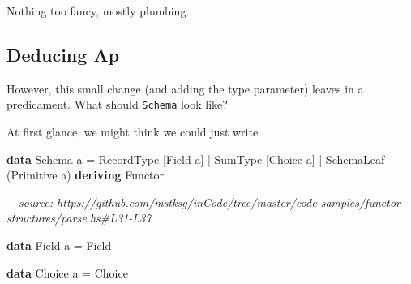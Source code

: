 \documentclass[]{article}
\newenvironment{Shaded}{}{}
\newcommand{\CommentTok}[1]{\textcolor[rgb]{0.38,0.63,0.69}{\textit{#1}}}
\newcommand{\DataTypeTok}[1]{\textcolor[rgb]{0.56,0.13,0.00}{#1}}
\newcommand{\FunctionTok}[1]{\textcolor[rgb]{0.02,0.16,0.49}{#1}}
\newcommand{\KeywordTok}[1]{\textcolor[rgb]{0.00,0.44,0.13}{\textbf{#1}}}
\newcommand{\NormalTok}[1]{#1}
\newcommand{\OperatorTok}[1]{\textcolor[rgb]{0.40,0.40,0.40}{#1}}
\newcommand{\OtherTok}[1]{\textcolor[rgb]{0.00,0.44,0.13}{#1}}
\newcommand{\StringTok}[1]{\textcolor[rgb]{0.25,0.44,0.63}{#1}}
\begin{document}
\begin{Shaded}
\end{Shaded}

Nothing too fancy, mostly plumbing.

\subsection{Deducing Ap}\label{deducing-ap}

However, this small change (and adding the type parameter) leaves in a
predicament. What should \texttt{Schema} look like?

At first glance, we might think we could just write

\begin{Shaded}
\begin{Highlighting}[]
\KeywordTok{data} \DataTypeTok{Schema}\NormalTok{ a }\OtherTok{=}
      \DataTypeTok{RecordType}\NormalTok{  [}\DataTypeTok{Field}\NormalTok{ a]}
    \OperatorTok{|} \DataTypeTok{SumType}\NormalTok{     [}\DataTypeTok{Choice}\NormalTok{ a]}
    \OperatorTok{|} \DataTypeTok{SchemaLeaf}\NormalTok{  (}\DataTypeTok{Primitive}\NormalTok{ a)}
  \KeywordTok{deriving} \DataTypeTok{Functor}

\CommentTok{{-}{-} source: https://github.com/mstksg/inCode/tree/master/code{-}samples/functor{-}structures/parse.hs\#L31{-}L37}

\KeywordTok{data} \DataTypeTok{Field}\NormalTok{ a }\OtherTok{=} \DataTypeTok{Field}

\KeywordTok{data} \DataTypeTok{Choice}\NormalTok{ a }\OtherTok{=} \DataTypeTok{Choice}
\end{Highlighting}
\end{Shaded}
\end{document}

